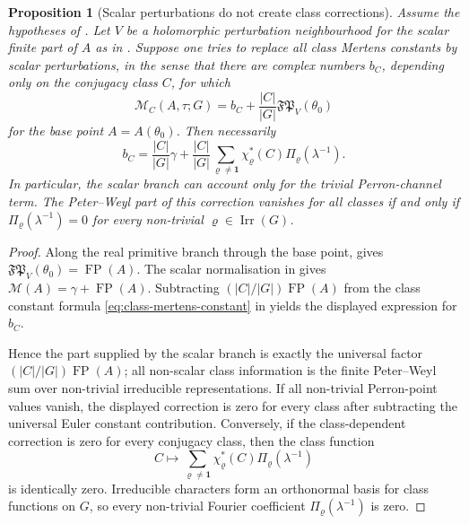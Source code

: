 \documentclass[11pt,a4paper]{amsart}
\theoremstyle{plain}
\newtheorem{proposition}[theorem]{Proposition}
\theoremstyle{definition}
\theoremstyle{remark}
\DeclareMathOperator{\Irr}{Irr}
\DeclareMathOperator{\FP}{FP}
\begin{document}
\begin{proposition}[Scalar perturbations do not create class corrections]
  \label{prop:scalar-boundary-no-class-correction}
  Assume the hypotheses of .  Let
  \(V\) be a holomorphic perturbation neighbourhood for the scalar
  finite part of \(A\) as in
  .  Suppose one tries to
  replace all class Mertens constants by scalar perturbations, in the
  sense that there are complex numbers \(b_C\), depending only on the
  conjugacy class \(C\), for which
  \[
    \mathcal M_C(A,\tau;G)=b_C+\frac{|C|}{|G|}\mathfrak{FP}_{V}(\theta_0)
  \]
  for the base point \(A=A(\theta_0)\).  Then necessarily
  \[
    b_C=\frac{|C|}{|G|}\gamma
      +\frac{|C|}{|G|}
        \sum_{\varrho\neq\mathbf1}
          \chi_\varrho^\ast(C)\Pi_\varrho(\lambda^{-1}).
  \]
  In particular, the scalar branch can account only for the trivial
  Perron-channel term.  The Peter--Weyl part of this correction vanishes
  for all classes if and only if
  \(\Pi_\varrho(\lambda^{-1})=0\) for every non-trivial
  \(\varrho\in\Irr(G)\).
\end{proposition}

\begin{proof}
  Along the real primitive branch through the base point,
   gives
  \(\mathfrak{FP}_{V}(\theta_0)=\FP(A)\).  The scalar normalisation in
   gives
  \(\mathcal M(A)=\gamma+\FP(A)\).  Subtracting
  \((|C|/|G|)\FP(A)\) from the class constant formula
  \eqref{eq:class-mertens-constant} in
   yields the displayed expression for
  \(b_C\).

  Hence the part supplied by the scalar branch is exactly the universal
  factor \((|C|/|G|)\FP(A)\); all non-scalar class information is the
  finite Peter--Weyl sum over non-trivial irreducible representations.
  If all non-trivial Perron-point values vanish, the displayed
  correction is zero for every class after subtracting the universal
  Euler constant contribution. Conversely, if the class-dependent
  correction is zero for every conjugacy class, then the class function
  \[
    C\longmapsto
    \sum_{\varrho\neq\mathbf1}
      \chi_\varrho^\ast(C)\Pi_\varrho(\lambda^{-1})
  \]
  is identically zero.  Irreducible characters form an orthonormal basis
  for class functions on \(G\), so every non-trivial Fourier coefficient
  \(\Pi_\varrho(\lambda^{-1})\) is zero.
\end{proof}
\end{document}
